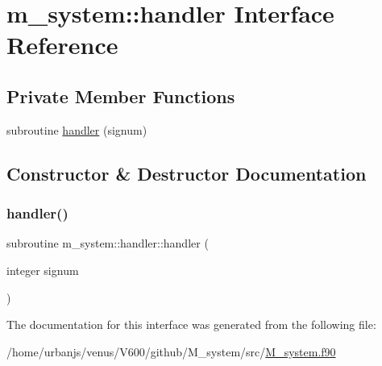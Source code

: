 \hypertarget{interfacem__system_1_1handler}{}\section{m\+\_\+system\+:\+:handler Interface Reference}
\label{interfacem__system_1_1handler}
\subsection*{Private Member Functions}
\begin{DoxyCompactItemize}
\item 
subroutine \mbox{\hyperlink{interfacem__system_1_1handler_a647aa82aa22887734f637888a00b1976}{handler}} (signum)
\end{DoxyCompactItemize}


\subsection{Constructor \& Destructor Documentation}
\mbox{\label{interfacem__system_1_1handler_a647aa82aa22887734f637888a00b1976}} 
\subsubsection{\texorpdfstring{handler()}{handler()}}
{\footnotesize\ttfamily subroutine m\+\_\+system\+::handler\+::handler (\begin{DoxyParamCaption}\item[{integer}]{signum }\end{DoxyParamCaption})\hspace{0.3cm}{\ttfamily [private]}}



The documentation for this interface was generated from the following file\+:\begin{DoxyCompactItemize}
\item 
/home/urbanjs/venus/\+V600/github/\+M\+\_\+system/src/\mbox{\hyperlink{M__system_8f90}{M\+\_\+system.\+f90}}\end{DoxyCompactItemize}
